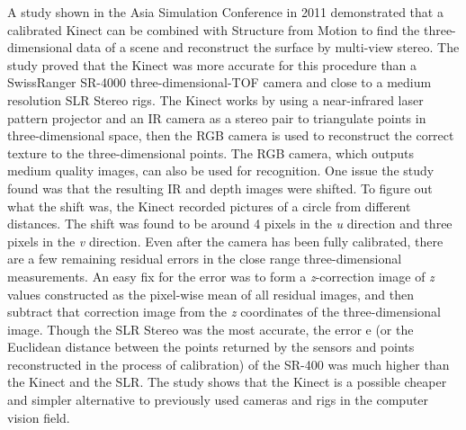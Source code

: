 \documentclass[pdftex,10.5pt]{report}
\begin{document}
A study shown in the Asia Simulation Conference in 2011 demonstrated that a calibrated Kinect can be combined with Structure from Motion to find the three-dimensional data of a scene and reconstruct the surface by multi-view stereo. The study proved that the Kinect was more accurate for this procedure than a SwissRanger SR-4000 three-dimensional-TOF camera and close to a medium resolution SLR Stereo rigs. The Kinect works by using a near-infrared laser pattern projector and an IR camera as a stereo pair to triangulate points in three-dimensional space, then the RGB camera is used to reconstruct the correct texture to the three-dimensional points. The RGB camera, which outputs medium quality images, can also be used for recognition. One issue the study found was that the resulting IR and depth images were shifted. To figure out what the shift was, the Kinect recorded pictures of a circle from different distances. The shift was found to be around 4 pixels in the \emph{u} direction and three pixels in the \emph{v} direction. Even after the camera has been fully calibrated, there are a few remaining residual errors in the close range three-dimensional measurements. An easy fix for the error was to form a \emph{z}-correction image of \emph{z} values constructed as the pixel-wise mean of all residual images, and then subtract that correction image from the \emph{z} coordinates of the three-dimensional image.\cite{cite1} Though the SLR Stereo was the most accurate, the error e (or the Euclidean distance between the points returned by the sensors and points reconstructed in the process of calibration) of the SR-400 was much higher than the Kinect and the SLR. The study shows that the Kinect is a possible cheaper and simpler alternative to previously used cameras and rigs in the computer vision field.
\end{document}
